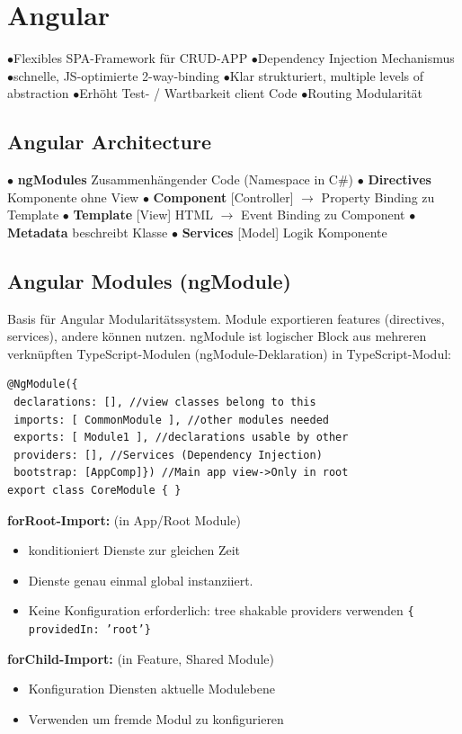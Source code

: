 

\section{Angular}

$\bullet$Flexibles SPA-Framework für CRUD-APP
$\bullet$Dependency Injection Mechanismus
$\bullet$schnelle, JS-optimierte 2-way-binding
$\bullet$Klar strukturiert, multiple levels of abstraction
$\bullet$Erhöht Test- / Wartbarkeit client Code
$\bullet$Routing Modularität

\subsection{Angular Architecture}
$\bullet$ \textbf{ngModules} Zusammenhängender Code (Namespace in C\#)
$\bullet$ \textbf{Directives} Komponente ohne View
$\bullet$ \textbf{Component} [Controller] $\rightarrow$ Property Binding zu Template
$\bullet$ \textbf{Template} [View] HTML $\rightarrow$ Event Binding zu Component
$\bullet$ \textbf{Metadata} beschreibt Klasse
$\bullet$ \textbf{Services} [Model] Logik Komponente

\subsection{Angular Modules (ngModule)}
Basis für Angular Modularitätssystem. Module exportieren features (directives, services), andere können nutzen.
ngModule ist logischer Block aus mehreren verknüpften TypeScript-Modulen (ngModule-Deklaration) in TypeScript-Modul:
\begin{lstlisting}[style=JavaScript]
@NgModule({
 declarations: [], //view classes belong to this
 imports: [ CommonModule ], //other modules needed
 exports: [ Module1 ], //declarations usable by other
 providers: [], //Services (Dependency Injection)
 bootstrap: [AppComp]}) //Main app view->Only in root
export class CoreModule { }
\end{lstlisting}

\textbf{forRoot-Import:} (in App/Root Module)
\begin{itemize}
    \item konditioniert Dienste zur gleichen Zeit
    \item Dienste genau einmal global instanziiert.
    \item Keine Konfiguration erforderlich: tree shakable providers verwenden \texttt{\tiny \{ providedIn: 'root'\}}
\end{itemize}
\textbf{forChild-Import:} (in Feature, Shared Module)
\begin{itemize}
    \item Konfiguration Diensten aktuelle Modulebene
    \item Verwenden um fremde Modul zu konfigurieren
\end{itemize}

